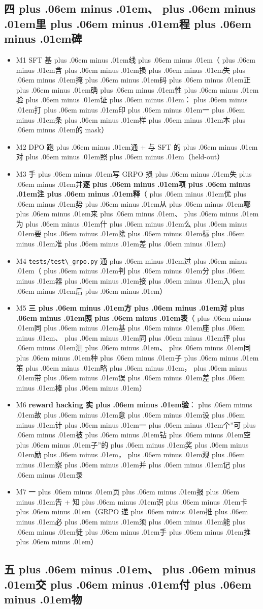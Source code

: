 \documentclass[
]{article}
\newcommand{\passthrough}[1]{#1}
\providecommand{\tightlist}{%
  \setlength{\itemsep}{0pt}\setlength{\parskip}{0pt}}
\def\zh#1{{\zhfont #1}}
\def\zhglue{\hskip0pt plus .06em minus .01em}
\begin{document}
\subsection{\zh{四\zhglue 、\zhglue 里\zhglue 程\zhglue 碑}}\label{ux56dbux91ccux7a0bux7891-6}

\begin{itemize}
\tightlist
\item[$\square$]
  M1 SFT \zh{基\zhglue 线\zhglue （\zhglue 含\zhglue 损\zhglue 失\zhglue 掩\zhglue 码\zhglue 正\zhglue 确\zhglue 性\zhglue 验\zhglue 证\zhglue ：\zhglue 打\zhglue 印\zhglue 一\zhglue 条\zhglue 样\zhglue 本\zhglue 的} mask\zh{）}
\item[$\square$]
  M2 DPO \zh{跑\zhglue 通} + \zh{与} SFT \zh{的\zhglue 对\zhglue 照\zhglue （}held-out\zh{）}
\item[$\square$]
  M3 \zh{手\zhglue 写} GRPO \zh{损\zhglue 失\zhglue 并}\textbf{\zh{逐\zhglue 项\zhglue 注\zhglue 释}}\zh{（\zhglue 优\zhglue 势\zhglue 从\zhglue 哪\zhglue 来\zhglue 、\zhglue 为\zhglue 什\zhglue 么\zhglue 要\zhglue 除\zhglue 标\zhglue 准\zhglue 差\zhglue ）}
\item[$\square$]
  M4 \passthrough{\lstinline!tests/test\_grpo.py!} \zh{通\zhglue 过\zhglue （\zhglue 判\zhglue 分\zhglue 器\zhglue 接\zhglue 入\zhglue 后\zhglue ）}
\item[$\square$]
  M5 \textbf{\zh{三\zhglue 方\zhglue 对\zhglue 照\zhglue 表}}\zh{（\zhglue 同\zhglue 基\zhglue 座\zhglue 、\zhglue 同\zhglue 评\zhglue 测\zhglue 、\zhglue 同\zhglue 种\zhglue 子\zhglue 策\zhglue 略\zhglue ，\zhglue 带\zhglue 误\zhglue 差\zhglue 棒\zhglue ）}
\item[$\square$]
  M6 \textbf{reward hacking \zh{实\zhglue 验}}\zh{：\zhglue 故\zhglue 意\zhglue 设\zhglue 计\zhglue 一\zhglue 个}''\zh{可\zhglue 被\zhglue 钻\zhglue 空\zhglue 子}''\zh{的\zhglue 奖\zhglue 励\zhglue ，\zhglue 观\zhglue 察\zhglue 并\zhglue 记\zhglue 录}
\item[$\square$]
  M7 \zh{一\zhglue 页\zhglue 报\zhglue 告} + \zh{知\zhglue 识\zhglue 卡\zhglue （}GRPO \zh{递\zhglue 推\zhglue 必\zhglue 须\zhglue 能\zhglue 徒\zhglue 手\zhglue 推\zhglue ）}
\end{itemize}

\subsection{\zh{五\zhglue 、\zhglue 交\zhglue 付\zhglue 物}}\label{ux4e94ux4ea4ux4ed8ux7269-6}
\end{document}
